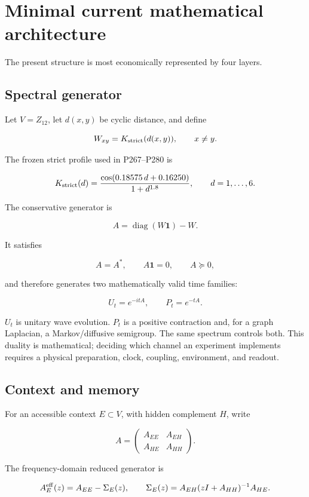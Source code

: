\documentclass[11pt,a4paper,openany]{report}
\begin{document}
\chapter{Minimal current mathematical architecture}

The present structure is most economically represented by four layers.

\section{Spectral generator}

Let \(V=Z_{12}\), let \(d(x,y)\) be cyclic distance, and define

\[
W_{xy}=K_{\rm strict}(d(x,y)),\qquad x\ne y.
\]

The frozen strict profile used in P267--P280 is

\[
K_{\rm strict}(d)
=
\frac{\cos(0.18575\,d+0.16250)}
{1+d^{1.8}},
\qquad d=1,\ldots,6.
\]

The conservative generator is

\[
A=\operatorname{diag}(W\mathbf1)-W.
\]

It satisfies

\[
A=A^\ast,\qquad A\mathbf1=0,\qquad A\succeq0,
\]

and therefore generates two mathematically valid time families:

\[
U_t=e^{-itA},\qquad P_t=e^{-tA}.
\]

\(U_t\) is unitary wave evolution. \(P_t\) is a positive contraction and, for a graph Laplacian, a Markov/\allowbreak{}diffusive semigroup. The same spectrum controls both. This duality is mathematical; deciding which channel an experiment implements requires a physical preparation, clock, coupling, environment, and readout.

\section{Context and memory}

For an accessible context \(E\subset V\), with hidden complement \(H\), write

\[
A=
\begin{pmatrix}
A_{EE} & A_{EH}\\
A_{HE} & A_{HH}
\end{pmatrix}.
\]

The frequency-domain reduced generator is

\[
A_E^{\rm eff}(z)
=
A_{EE}
-
\Sigma_E(z),
\qquad
\Sigma_E(z)
=
A_{EH}(zI+A_{HH})^{-1}A_{HE}.
\]
\end{document}
